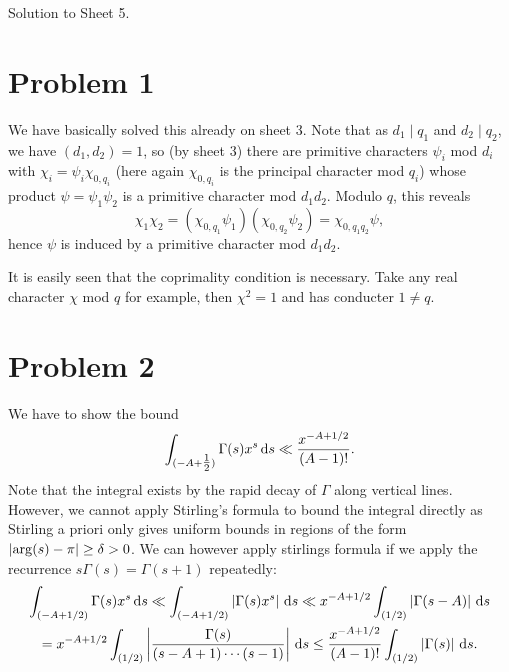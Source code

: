 \documentclass[a4paper,11pt]{article}
\author{Max von Consbruch}
\begin{document}
\begin{center}
    \huge{Solution to Sheet 5.}
\end{center}

\section*{Problem 1}
We have basically solved this already on sheet 3. Note that as $d_1 \mid q_1$ and 
$d_2 \mid q_2$, we have $(d_1, d_2) = 1$, so (by sheet 3) there are primitive
characters $\psi_i$ mod $d_i$ with $\chi_i = \psi_i \chi_{0,q_i}$ (here again
$\chi_{0,q_i}$ is the principal character mod $q_i$) whose product $\psi =
\psi_1 \psi_2$ is a primitive character mod $d_1d_2$. Modulo $q$, this
reveals
\[
    \chi_1 \chi_2 =  (\chi_{0, q_1} \psi_1) (\chi_{0, q_2} \psi_2) =
    \chi_{0,q_1 q_2} \psi, 
\]
hence $\psi$ is induced by a primitive character mod $d_1d_2$. 

It is easily seen that the coprimality condition is necessary. Take any real
character $\chi$ mod $q$ for example, then $\chi^2 = 1$ and has conducter 
$1 \neq q$. 

\section*{Problem 2}
We have to show the bound
\[
    \int_{(-A + \tfrac 12)} \Gamma(s) x^s \mathrm{\,d} s \ll \frac{x^{-A +
    1/2}}{(A-1)!}.
\]
Note that the integral exists by the rapid decay of $\Gamma$ along vertical
lines. However, we cannot apply Stirling's formula to bound the integral directly
as Stirling a priori only gives uniform bounds in regions of the form $\left\lvert \arg(s)
- \pi \right\rvert \geq \delta > 0$. We can however apply stirlings formula if we apply the recurrence
$s\Gamma(s) = \Gamma(s+1)$ repeatedly: 
\begin{multline*}
    \int_{(-A+1/2)} \Gamma(s) x^s \mathrm{\,d} s \ll 
    \int_{(-A+1/2)} \left\lvert \Gamma(s) x^s \right\rvert \mathrm{\,d} s \ll 
    x^{-A+1/2} \int_{(1/2)} \left\lvert \Gamma(s-A) \right\rvert \mathrm{\,d} s \\ 
    = x^{-A+1/2} \int_{(1/2)} \left\lvert \frac {\Gamma(s)}{(s-A+1) \cdots (s-1)} \right\rvert
    \mathrm{\,d} s \leq \frac{x^{-A + 1/2}}{(A-1)!} \int_{(1/2)} \left\lvert \Gamma(s) \right\rvert \mathrm{\,d} s. 
\end{multline*}
\end{document}
